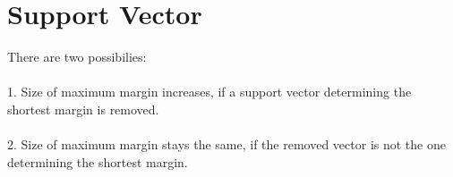\documentclass{article}
\begin{document}
        \section{Support Vector}
        There are two possibilies:\\\\
        1. Size of maximum margin increases, if a support vector determining the shortest margin is removed.\\\\
        2. Size of maximum margin stays the same, if the removed vector is not the one determining the shortest margin.
       
\end{document}
